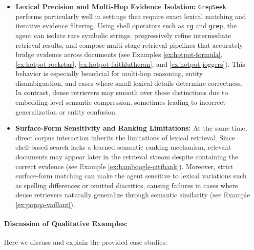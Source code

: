 \documentclass{llmxive}
\providecommand{\ourmethod}{\texttt{GrepSeek}\xspace}
\begin{document}
\begin{itemize}[leftmargin=1.2em]
    \item \textbf{Lexical Precision and Multi-Hop Evidence Isolation:} \ourmethod{} performs particularly well in settings that require exact lexical matching and iterative evidence filtering. Using shell operators such as \texttt{rg} and \texttt{grep}, the agent can isolate rare symbolic strings, progressively refine intermediate retrieval results, and compose multi-stage retrieval pipelines that accurately bridge evidence across documents (see Examples \ref{ex:hotpot-formula}, \ref{ex:hotpot-rockstar}, \ref{ex:hotpot-faithlutheran}, and \ref{ex:hotpot-joggers}). This behavior is especially beneficial for multi-hop reasoning, entity disambiguation, and cases where small lexical details determine correctness. In contrast, dense retrievers may smooth over these distinctions due to embedding-level semantic compression, sometimes leading to incorrect generalization or entity confusion.
    
    \item \textbf{Surface-Form Sensitivity and Ranking Limitations:} At the same time, direct corpus interaction inherits the limitations of lexical retrieval. Since shell-based search lacks a learned semantic ranking mechanism, relevant documents may appear later in the retrieval stream despite containing the correct evidence (see Example \ref{ex:bamboogle-citibank}). Moreover, strict surface-form matching can make the agent sensitive to lexical variations such as spelling differences or omitted diacritics, causing failures in cases where dense retrievers naturally generalize through semantic similarity (see Example \ref{ex:popqa-vaillant}).
\end{itemize}

\paragraph{Discussion of Qualitative Examples:} Here we discuss and explain the provided case studies:
\end{document}

